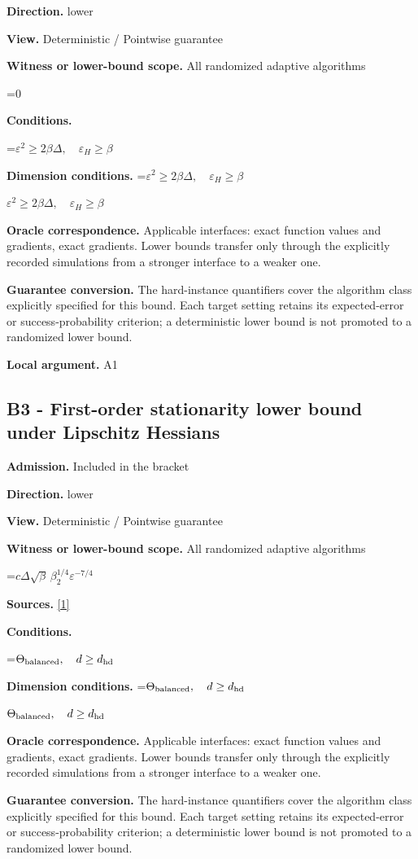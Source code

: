 \documentclass[10pt,a4paper]{article}
\newcommand{\AtlasMath}[1]{\par\begingroup\centering\setbox0=\hbox{$\displaystyle #1$}\ifdim\wd0>1.4\linewidth\typeout{ATLAS WIDE FORMULA: \the\wd0}\fi\ifdim\wd0>\linewidth\resizebox{\linewidth}{!}{\box0}\else\box0\fi\par\endgroup}
\newcommand{\AtlasInlineMath}[1]{\begingroup\setbox0=\hbox{$#1$}\ifdim\wd0>.4\linewidth\endgroup\AtlasMath{#1}\else\endgroup$#1$\fi}
\begin{document}
\textbf{Direction.} lower

\textbf{View.} Deterministic / Pointwise guarantee

\textbf{Witness or lower-bound scope.} All randomized adaptive algorithms

\AtlasMath{0}
\textbf{Conditions.} 
\AtlasMath{\varepsilon^2\ge2\beta\Delta,\quad\varepsilon_H\ge\beta}


\textbf{Dimension conditions.} \AtlasInlineMath{\varepsilon^2\ge2\beta\Delta,\quad\varepsilon_H\ge\beta}

\textbf{Oracle correspondence.} Applicable interfaces: exact function values and gradients, exact gradients. Lower bounds transfer only through the explicitly recorded simulations from a stronger interface to a weaker one.

\textbf{Guarantee conversion.} The hard-instance quantifiers cover the algorithm class explicitly specified for this bound. Each target setting retains its expected-error or success-probability criterion; a deterministic lower bound is not promoted to a randomized lower bound.

\textbf{Local argument.} A1

\subsection{B3 - First-order stationarity lower bound under Lipschitz Hessians}
\textbf{Admission.} Included in the bracket

\textbf{Direction.} lower

\textbf{View.} Deterministic / Pointwise guarantee

\textbf{Witness or lower-bound scope.} All randomized adaptive algorithms

\AtlasMath{c\Delta\sqrt\beta\,\beta_2^{1/4}\varepsilon^{-7/4}}
\textbf{Sources.} \href{https://arxiv.org/pdf/2610.00245v2}{[1]}

\textbf{Conditions.} 
\AtlasMath{\Theta_{\rm balanced},\quad d\ge d_{\rm hd}}


\textbf{Dimension conditions.} \AtlasInlineMath{\Theta_{\rm balanced},\quad d\ge d_{\rm hd}}

\textbf{Oracle correspondence.} Applicable interfaces: exact function values and gradients, exact gradients. Lower bounds transfer only through the explicitly recorded simulations from a stronger interface to a weaker one.

\textbf{Guarantee conversion.} The hard-instance quantifiers cover the algorithm class explicitly specified for this bound. Each target setting retains its expected-error or success-probability criterion; a deterministic lower bound is not promoted to a randomized lower bound.
\end{document}
